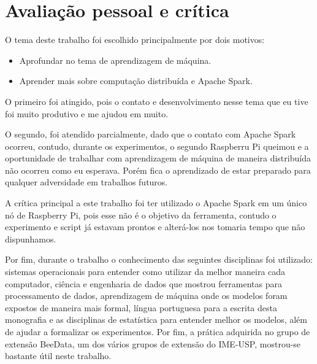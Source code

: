 
\chapter{Avaliação pessoal e crítica}
\label{cap:avaliacao_pessoal}

O tema deste trabalho foi escolhido principalmente por dois motivos:

\begin{itemize}
    \item Aprofundar no tema de aprendizagem de máquina.
    \item Aprender mais sobre computação distribuída e Apache Spark.
\end{itemize}

O primeiro foi atingido, pois o contato e desenvolvimento nesse tema que eu tive
foi muito produtivo e me ajudou em muito.

O segundo, foi atendido parcialmente, dado que o contato com Apache Spark ocorreu,
contudo, durante os experimentos, o segundo Raspberru Pi queimou e a oportunidade de 
trabalhar com aprendizagem de máquina de maneira distribuída não ocorreu como eu 
esperava. Porém fica o aprendizado de estar preparado para qualquer adversidade em
trabalhos futuros.

A crítica principal a este trabalho foi ter utilizado o Apache Spark em um único nó 
de Raspberry Pi, pois esse não é o objetivo da ferramenta, contudo o experimento e 
script já estavam prontos e alterá-los nos tomaria tempo que não dispunhamos. 

Por fim, durante o trabalho o conhecimento das seguintes disciplinas foi utilizado: sistemas
operacionais para entender como utilizar da melhor maneira cada computador, ciência e engenharia
de dados que mostrou ferramentas para processamento de dados, aprendizagem de máquina onde os 
modelos foram expostos de maneira mais formal, língua portuguesa para a escrita desta monografia
e as disciplinas de estatística para entender melhor os modelos, além de ajudar a formalizar os 
experimentos. Por fim, a prática adquirida no grupo de extensão  BeeData, um dos vários grupos 
de extensão do IME-USP, mostrou-se bastante útil neste trabalho.
